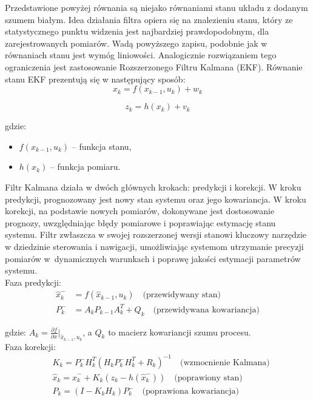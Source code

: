 Przedstawione powyżej równania są niejako równaniami stanu układu z dodanym szumem białym. Idea działania filtra opiera się na znalezieniu stanu, który ze statystycznego punktu widzenia jest najbardziej prawdopodobnym, dla zarejestrowanych pomiarów. Wadą powyższego zapisu, podobnie jak w równaniach stanu jest wymóg liniowości. Analogicznie rozwiązaniem tego ograniczenia jest zastosowanie Rozszerzonego Filtru Kalmana (EKF). Równanie stanu EKF prezentują się w następujący sposób:
\[
  x_k =  f \left( x_{k-1},  u_k \right) + w_k
\]

\[
  z_k = h \left(x_k \right) + v_k
\]

gdzie:
\begin{itemize}
  \item $ f \left( x_{k-1},  u_k \right)$ -- funkcja stanu, 
  \item $h \left(x_k \right)$ -- funkcja pomiaru.
\end{itemize}

Filtr Kalmana działa w dwóch głównych krokach: predykcji i korekcji. W kroku predykcji, prognozowany jest nowy stan systemu oraz jego kowariancja. W kroku korekcji, na podstawie nowych pomiarów, dokonywane jest dostosowanie prognozy, uwzględniając błędy pomiarowe i poprawiając estymację stanu systemu. Filtr zwłaszcza w swojej rozszerzonej wersji stanowi kluczowy narzędzie w dziedzinie sterowania i nawigacji, umożliwiając systemom utrzymanie precyzji pomiarów w~dynamicznych warunkach i poprawę jakości estymacji parametrów systemu.\\

Faza predykcji:
\[
\begin{aligned}
  \hat{x}_k^- & = f(\hat{x}_{k-1}, u_k) \quad \text{(przewidywany stan)} \\
  P_k^- & = A_k P_{k-1} A_k^T + Q_k \quad \text{(przewidywana kowariancja)}
\end{aligned}
\]

gdzie: $A_k = \frac{\partial f}{\partial x}\Bigr|_{\hat{x}_{k-1}, u_k}$, a $Q_k$ to macierz kowariancji szumu procesu.\\

Faza korekcji:
\[
\begin{aligned}
  &K_k = P_k^- H_k^T (H_k P_k^- H_k^T + R_k)^{-1} \quad \text{(wzmocnienie Kalmana)} \\
  &\hat{x}_k = \hat{x}_k^- + K_k(z_k - h(\hat{x}_k^-)) \quad \text{(poprawiony stan)} \\
  &P_k = (I - K_k H_k) P_k^- \quad \text{(poprawiona kowariancja)}
\end{aligned}
\]

